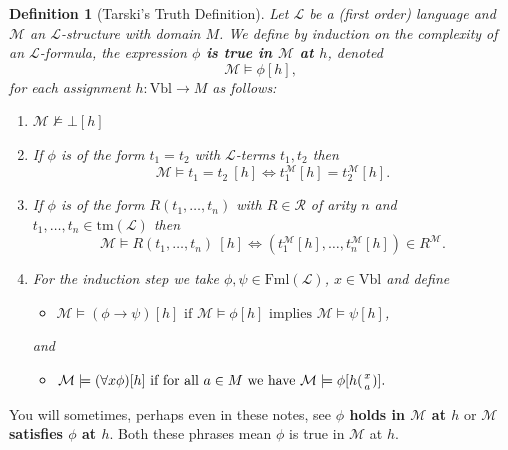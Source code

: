 \documentclass[11pt]{article}
\newcommand{\tm}{\textrm{tm}}
\newcommand{\Fml}{\textrm{Fml}}
\newcommand{\Vbl}{\textrm{Vbl}}
\newtheorem{definition}[theorem]{Definition}
\newcommand{\mcal}[1]{\mathcal{#1}}
\begin{document}
\begin{definition}[Tarski's Truth Definition]
Let $\mcal{L}$ be a (first order) language and $\mcal{M}$ an $\mcal{L}$-structure with domain $M$.
We define by induction on the complexity of
an $\mcal{L} $-formula,
the expression \textbf{$\phi $ is true in $\mcal{M} $ at $h$},
denoted
$$\mcal{M} \models \phi [h],$$ for each assignment $h:\Vbl\rightarrow M$
as follows:

\begin{enumerate}
\item[(0)] $\mcal{M}\nvDash\bot[h]$
\item[(1)]
If $\phi $ is of the form $t_1= t_2$ with $\mcal{L} $-terms
$t_1,t_2$ then
$$\mcal{M} \models t_1= t_2\  [h]\iff t^\mcal{M} _1[h]=t^\mcal{M} _2[h].$$
\item[(2)] If $\phi $ is of the form $R(t_1,\ldots,t_n)$ with $R\in \mcal{R} $ of arity $n$ and $t_1,\ldots,t_n\in \tm(\mcal{L}) $ then
$$\mcal{M} \models R(t_1,\ldots,t_n)\ [h]\iff (t^\mcal{M} _1[h],\ldots,t^\mcal{M} _n[h])\in R^\mcal{M} .$$
\item[(3)] For the induction step we take $\phi ,\psi \in \Fml(\mcal{L}) $, $x\in \Vbl $ and define


\begin{itemize}
\item $\mcal{M} \models (\phi \rightarrow \psi )[h] \text{ if }\mcal{M}\models \phi [h]\text { implies }\mcal{M}\models \psi [h]$,
\end{itemize}
 and
\begin{itemize}
\item $\mcal{M} \models (\forall x\phi )[h] \text{ if }
\text {for all }a\in M\text { we have }
\mcal{M} \models \phi [h({x\atop a})].$
\end{itemize}
\end{enumerate}
\end{definition}

You will sometimes, perhaps even in these notes, see \textbf{$\phi$ holds in $\mcal{M}$ at $h$} or \textbf{$\mcal{M}$ satisfies $\phi$ at $h$}. Both these phrases mean $\phi$ is true in $\mcal{M}$ at $h$.


\end{document}
